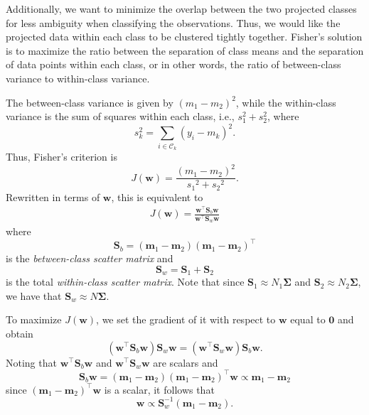 \documentclass[letterpaper, 10 pt, conference]{ieeeconf}  %
\newcommand{\ve}[1]{\mathbf{#1}}
\begin{document}
Additionally, we want to minimize the overlap between the two projected classes for less ambiguity when classifying the observations. Thus, we would like the projected data within each class to be clustered tightly together. Fisher's solution is to maximize the ratio between the separation of class means and the separation of data points within each class, or in other words, the ratio of between-class variance to within-class variance. 

The between-class variance is given by $(m_1-m_2)^2$, while the within-class variance is the sum of squares within each class, i.e., $s_1^2+s_2^2$, where $$s_k^2=\sum_{i\in{\mathcal{C}_k}}(y_i-m_k)^2.$$
Thus, Fisher's criterion is
$$J(\ve{w})=\frac{(m_1-m_2)^2}{{s_1}^2+{s_2}^2}.$$
Rewritten in terms of $\ve{w}$, this is equivalent to
\begin{align*}
    J(\ve{w})=\frac{\ve{w}^\top {\ve{S}_b}\ve{w}}{\ve{w}^\top {\ve{S}_w}\ve{w}}
\end{align*}
where $$\ve{S}_b=(\ve{m}_1-\ve{m}_2)(\ve{m}_1-\ve{m}_2)^\top$$ is the \textit{between-class scatter matrix} and 
$$\ve{S}_w = \ve{S}_1 + \ve{S}_2$$ 
is the total \textit{within-class scatter matrix}.
Note that since $\ve{S}_1 \approx N_1 \ve{\Sigma}$ and $\ve{S}_2 \approx N_2 \ve{\Sigma}$, we have that $\ve{S}_w \approx N\ve{\Sigma}.$

To maximize $J(\ve{w})$, we set the gradient of it with respect to $\ve{w}$ equal to $\ve{0}$ and obtain $$(\ve{w}^\top \ve{S}_b\ve{w})\ve{S}_w\ve{w} = (\ve{w}^\top \ve{S}_w\ve{w})\ve{S}_b\ve{w}.$$
Noting that $\ve{w}^\top\ve{S}_b\ve{w}$ and $\ve{w}^\top \ve{S}_w\ve{w}$ are scalars and $$\ve{S}_b\ve{w} = (\ve{m}_1-\ve{m}_2)(\ve{m}_1-\ve{m}_2)^\top \ve{w} \propto \ve{m}_1-\ve{m}_2$$ since $(\ve{m}_1-\ve{m}_2)^\top \ve{w}$ is a scalar, it follows that
$$\ve{w} \propto \ve{S}_w^{-1}(\ve{m}_1-\ve{m}_2).$$
\end{document}
